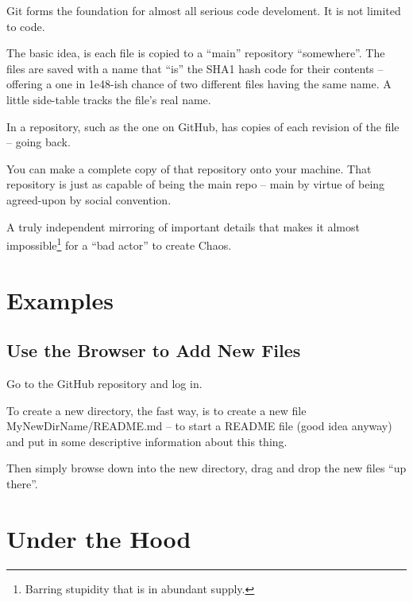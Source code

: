 \documentclass[letter,11pt,oneside]{article}
\begin{document}
Git forms the foundation for almost all serious code develoment.
It is not limited to code. 

The basic idea, is each file is copied to a ``main'' repository ``somewhere''.
The files are saved with a name that ``is'' the SHA1 hash code for
their contents -- offering a one in 1e48-ish chance of two different
files having the same name. A little side-table tracks the file's real
name. 

In a repository, such as the one on GitHub, has copies of each revision
of the file -- going back. 

You can make a complete copy of that repository onto your machine. That
repository is just as capable of being the main repo -- main by virtue
of being agreed-upon by social convention. 

A truly independent mirroring of important details that makes it
almost impossible\footnote{Barring stupidity that is in abundant
  supply.} for a ``bad actor'' to create Chaos\texttrademark.


\appendix
\renewcommand \thesection{\Alph{section}}

\section{Examples}

\subsection{Use the Browser to Add New Files}

Go to the GitHub repository and log in.

To create a new directory, the fast way, is to create a new file
MyNewDirName/README.md -- to start a README file (good idea anyway)
and put in some descriptive information about this thing.

Then simply browse down into the new directory, drag and drop
the new files ``up there''.



\section{Under the Hood}


{}
\renewcommand*{\refname}{My Bibliography and References}
\end{document}
